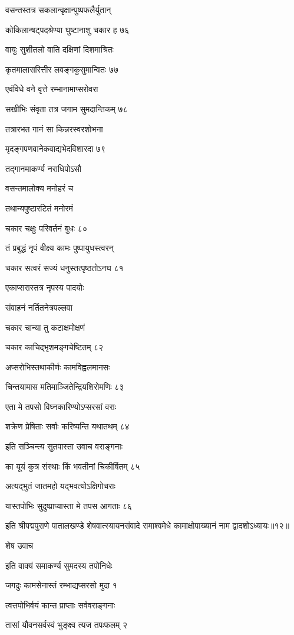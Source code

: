 वसन्तस्तत्र सकलान्वृक्षान्पुष्पफलैर्युतान्

कोकिलान्षट्पदश्रेण्या घुष्टानाशु चकार ह ७६

वायुः सुशीतलो वाति दक्षिणां दिशमाश्रितः

कृतमालासरित्तीर लवङ्गकुसुमान्वितः ७७

एवंविधे वने वृत्ते रम्भानामाप्सरोवरा

सखीभिः संवृता तत्र जगाम सुमदान्तिकम् ७८

तत्रारभत गानं सा किन्नरस्वरशोभना

मृदङ्गपणवानेकवाद्यभेदविशारदा ७९

तद्गानमाकर्ण्य नराधिपोऽसौ

वसन्तमालोक्य मनोहरं च

तथान्यपुष्टारटितं मनोरमं

चकार चक्षुः परिवर्तनं बुधः ८०

तं प्रबुद्धं नृपं वीक्ष्य कामः पुष्पायुधस्त्वरन्

चकार सत्वरं सज्यं धनुस्तत्पृष्ठतोऽनघ ८१

एकाप्सरास्तत्र नृपस्य पादयोः

संवाहनं नर्तितनेत्रपल्लवा

चकार चान्या तु कटाक्षमोक्षणं

चकार काचिद्भृशमङ्गचेष्टितम् ८२

अप्सरोभिस्तथाकीर्णः कामविह्वलमानसः

चिन्तयामास मतिमाञ्जितेन्द्रियशिरोमणिः ८३

एता मे तपसो विघ्नकारिण्योऽप्सरसां वराः

शक्रेण प्रेषिताः सर्वाः करिष्यन्ति यथातथम् ८४

इति सञ्चिन्त्य सुतपास्ता उवाच वराङ्गनाः

का यूयं कुत्र संस्थाः किं भवतीनां चिकीर्षितम् ८५

अत्यद्भुतं जातमहो यद्भवत्योऽक्षिगोचराः

यास्तपोभिः सुदुष्प्राप्यास्ता मे तपस आगताः ८६

इति श्रीपद्मपुराणे पातालखण्डे शेषवात्स्यायनसंवादे रामाश्वमेधे कामाक्षोपाख्यानं नाम द्वादशोऽध्यायः॥१२॥


शेष उवाच

इति वाक्यं समाकर्ण्य सुमदस्य तपोनिधेः

जगदुः कामसेनास्तं रम्भाद्यप्सरसो मुदा १

त्वत्तपोभिर्वयं कान्त प्राप्ताः सर्ववराङ्गनाः

तासां यौवनसर्वस्वं भुङ्क्ष्व त्यज तपःफलम् २

